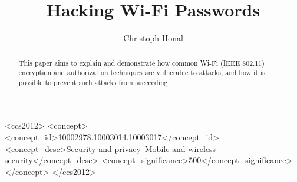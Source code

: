 \documentclass[sigconf]{acmart}
\begin{document}
\title{Hacking Wi-Fi Passwords}

\author{Christoph Honal}

\begin{abstract}
This paper aims to explain and demonstrate how common Wi-Fi (IEEE 802.11) encryption and authorization techniques are vulnerable to attacks, and how it is possible to prevent such attacks from succeeding.
\end{abstract}

\begin{CCSXML}
<ccs2012>
<concept>
<concept_id>10002978.10003014.10003017</concept_id>
<concept_desc>Security and privacy~Mobile and wireless security</concept_desc>
<concept_significance>500</concept_significance>
</concept>
</ccs2012>
\end{CCSXML}



\maketitle





\end{document}
